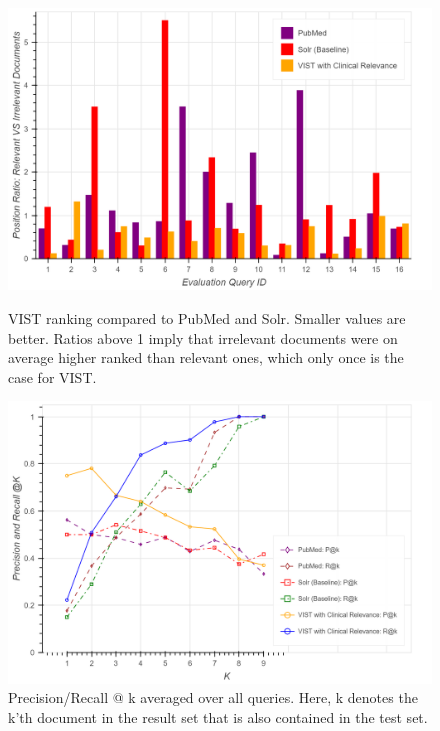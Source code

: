 \documentclass[fleqn,10pt]{wlscirep}
\begin{document}
\begin{figure}[htbp]
\centering
\begin{minipage}[b]{0.45\linewidth}
	\includegraphics[width=\linewidth]{img/eval/IrRelevantPositionsRatio_baseline_bar.png}
	\caption{VIST ranking compared to PubMed and Solr. Smaller values are better. Ratios above 1 imply that irrelevant documents were on average higher ranked than relevant ones, which only once is the case for VIST.}
	\label{img:ranking}
\end{minipage}
\hspace{0.3cm}
\begin{minipage}[b]{0.45\linewidth}
	\includegraphics[width=\linewidth]{img/eval/P_R_at_K.png}
	\caption{Precision/Recall @ k averaged over all queries. Here, k denotes the k’th document in the result set that is also contained in the test set.}
	\label{img:p_r_k}
\end{minipage}
\end{figure}
\end{document}
